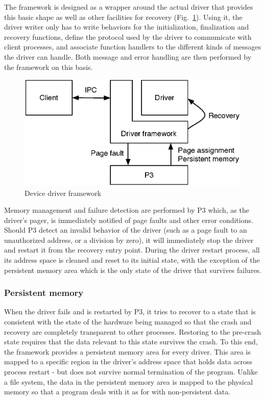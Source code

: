 \documentclass{report}
\begin{document}
The framework is designed as a wrapper around the actual driver that provides this basic shape as well as other facilities for recovery (Fig.~\ref{fig:fw}). Using it, the driver writer only has to write behaviors for the initialization, finalization and recovery functions, define the protocol used by the driver to communicate with client processes, and associate function handlers to the different kinds of messages the driver can handle. Both message and error handling are then performed by the framework on this basis.

\begin{figure}[ht]
\centering
\includegraphics[scale=0.6]{framework}
\caption{Device driver framework}
\label{fig:fw}
\end{figure}

Memory management and failure detection are performed by P3 which, as the driver's pager, is immediately notified of page faults and other error conditions. Should P3 detect an invalid behavior of the driver (such as a page fault to an unauthorized address, or a division by zero), it will immediately stop the driver and restart it from the recovery entry point. During the driver restart process, all its address space is cleaned and reset to its initial state, with the exception of the persistent memory area which is the only state of the driver that survives failures.

\subsubsection{Persistent memory}

When the driver fails and is restarted by P3, it tries to recover to a state that is consistent with the state of the hardware being managed so that the crash and recovery are completely transparent to other processes. Restoring to the pre-crash state requires that the data relevant to this state survives the crash. To this end, the framework provides a persistent memory area for every driver.  This area is mapped to a specific region in the driver's address space that holds data across process restart - but does not survive normal termination of the program.  Unlike a file system, the data in the persistent memory area is mapped to the physical memory so that a program deals with it as for with non-persistent data.
\end{document}
